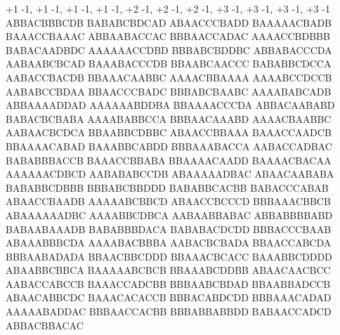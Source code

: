 +1 -1, +1 -1, +1 -1, +1 -1, +2 -1, +2 -1, +2 -1, +3 -1, +3 -1, +3 -1, +3 -1
ABBACBBBCDB
BABABCBDCAD
ABAACCCBADD
BAAAAACBADB
BAAACCBAAAC
ABBAABACCAC
BBBAACCADAC
AAAACCBDBBB
BABACAADBDC
AAAAAACCDBD
BBBABCBDDBC
ABBABACCCDA
AABAABCBCAD
BAAABACCCDB
BBAABCAACCC
BABABBCDCCA
AABACCBACDB
BBAAACAABBC
AAAACBBAAAA
AAAABCCDCCB
AABABCCBDAA
BBAACCCBADC
BBBABCBAABC
AAAABABCADB
ABBAAAADDAD
AAAAAABDDBA
BBAAAACCCDA
ABBACAABABD
BABACBCBABA
AAAABABBCCA
BBBAACAAABD
AAAACBAABBC
AABAACBCDCA
BBAABBCDBBC
ABAACCBBAAA
BAAACCAADCB
BBAAAACABAD
BAAABBCABDD
BBBAAABACCA
AABACCADBAC
BABABBBACCB
BAAACCBBABA
BBAAAACAADD
BAAAACBACAA
AAAAAACDBCD
AABABABCCDB
ABAAAAADBAC
ABAACAABABA
BABABBCDBBB
BBBABCBBDDD
BABABBCACBB
BABACCCABAB
ABAACCBAADB
AAAAABCBBCD
ABAACCBCCCD
BBBAAACBBCB
ABAAAAAADBC
AAAABBCDBCA
AABAABBABAC
ABBABBBBABD
BABAABAAADB
BABABBBDACA
BABABACDCDD
BBBACCCBAAB
ABAAABBBCDA
AAAABACBBBA
AABACBCBADA
BBAACCABCDA
BBBAABADADA
BBAACBBCDDD
BBAAACBCACC
BAAABBCDDDD
ABAABBCBBCA
BAAAAABCBCB
BBAAABCDDBB
ABAACAACBCC
AABACCABCCB
BAAACCADCBB
BBBAABCBDAD
BBAABBADCCB
ABAACABBCDC
BAAACACACCB
BBBACABDCDD
BBBAAACADAD
AAAAABADDAC
BBBAACCACBB
BBBABBABBDD
BABAACCADCD
ABBACBBACAC